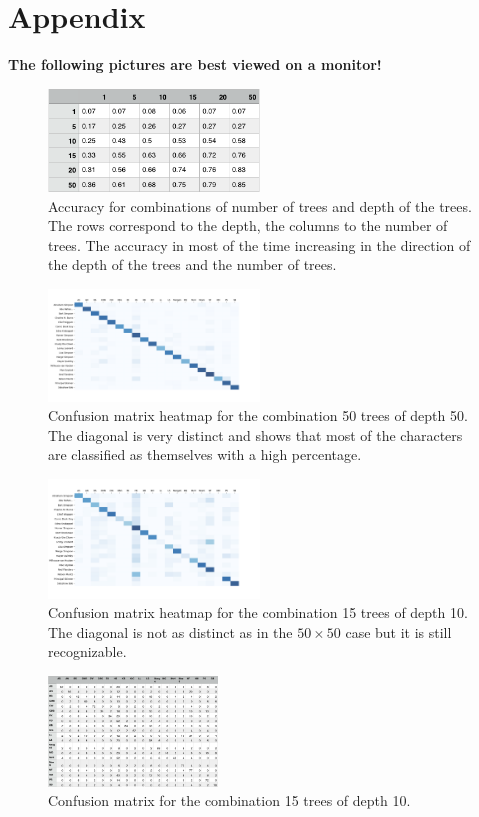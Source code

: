 \documentclass[journal, a4paper]{IEEEtran}
\begin{document}
\section{Appendix}
\textbf{The following pictures are best viewed on a monitor! 
}\begin{figure}[!ht]
	\centering
  \includegraphics[width=0.5\textwidth]{table1.png}
	\caption{Accuracy for combinations of number of trees and depth of the trees. The rows correspond to the depth, the columns to the number of trees. The accuracy in most of the time increasing in the direction of the depth of the trees and the number of trees.}
	\label{fig0}
\end{figure}
\begin{figure}[!hb]
  \includegraphics[width=0.5\textwidth]{50x50.png}
	\caption{Confusion matrix heatmap for the combination 50 trees of depth 50. The diagonal is very distinct and shows that most of the characters are classified as themselves with a high percentage.}
	\label{fig1}
\end{figure}
\newpage
\begin{figure}[!ht]
	\centering
  \includegraphics[width=0.5\textwidth]{15x10.png}
	\caption{Confusion matrix heatmap for the combination 15 trees of depth 10. The diagonal is not as distinct as in the \( 50 \times 50 \) case but it is still recognizable.}
	\label{fig2}
\end{figure}
\begin{figure}[!hb]
	\centering
  \includegraphics[width=0.4\textwidth]{15x10table.png}
	\caption{Confusion matrix for the combination 15 trees of depth 10.}
	\label{fig3}
\end{figure}
\end{document}
